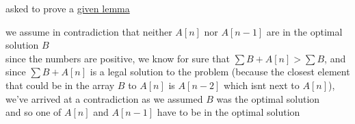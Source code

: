 \documentclass[a4paper,12pt]{article}
\begin{document}
\begin{question}
asked to prove a \href{./20230102173117-dynamic\_programming.org}{given lemma}\\
\begin{answer}
we assume in contradiction that neither \(A[n]\) nor \(A[n-1]\) are in the optimal solution \(B\)\\
since the numbers are positive, we know for sure that \(\sum B + A[n] > \sum B\), and since \(\sum B + A[n]\) is a legal solution to the problem (because the closest element that could be in the array \(B\) to \(A[n]\) is \(A[n-2]\) which isnt next to \(A[n]\)), we've arrived at a contradiction as we assumed \(B\) was the optimal solution\\
and so one of \(A[n]\) and \(A[n-1]\) have to be in the optimal solution\\
\end{answer}
\end{question}
\end{document}
